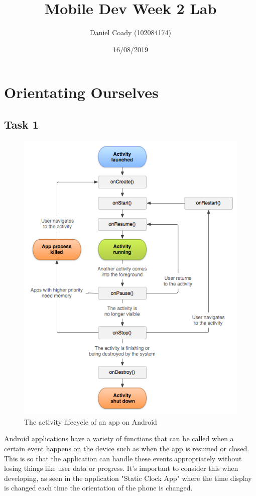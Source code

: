 \documentclass{scrartcl}
\title{Mobile Dev Week 2 Lab}
\author{Daniel Coady (102084174)}
\date{16/08/2019}
\begin{document}
\maketitle

\section*{Orientating Ourselves}
\subsection*{Task 1}
\begin{figure}[h]
    \centering
    \includegraphics[scale=0.4]{images/activitylifecycle.png}
    \caption{The activity lifecycle of an app on Android}
\end{figure}
Android applications have a variety of functions that can be called when a certain event happens
on the device such as when the app is resumed or closed. This is so that the application can
handle these events appropriately without losing things like user data or progress. It's important
to consider this when developing, as seen in the application "Static Clock App" where the time
display is changed each time the orientation of the phone is changed.
\end{document}
